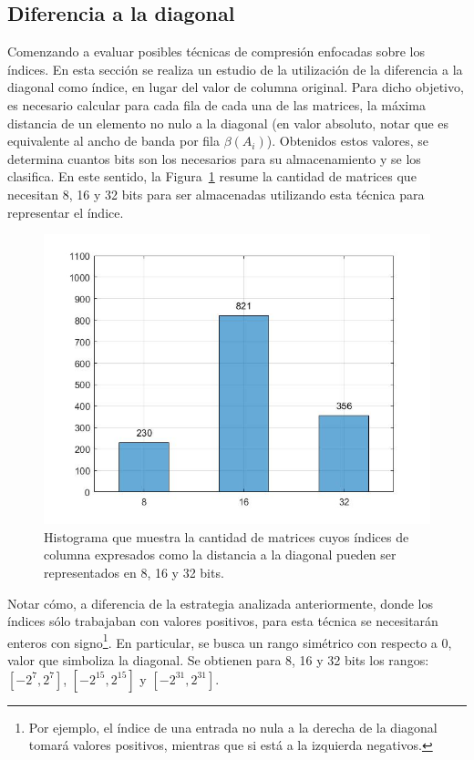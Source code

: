 \subsection{Diferencia a la diagonal}\label{diagonal-dif}

Comenzando a evaluar posibles técnicas de compresión enfocadas sobre los índices. %
En esta sección se realiza un estudio de la utilización de la diferencia a la diagonal como índice, en lugar del valor de columna original. Para dicho objetivo, es necesario calcular para cada fila de cada una de las matrices, la máxima distancia de un elemento no nulo a la diagonal (en valor absoluto, notar que es equivalente al ancho de banda por fila $\beta (A_i)$). Obtenidos estos valores, se determina cuantos bits son los necesarios  para su almacenamiento y se los clasifica. En este sentido, la Figura~\ref{fig:hist_diag_dist_cat} resume la cantidad de matrices que necesitan 8, 16 y 32 bits para ser almacenadas utilizando esta técnica para representar el índice. 

\begin{figure}[h]
  \centering
  \includegraphics[width=.6\textwidth]{imagenes/chap4/hist_diag_dist_cat.jpg}
  \caption{%
  Histograma que muestra la cantidad de matrices cuyos índices de columna expresados como la distancia a la diagonal pueden ser representados en 8, 16 y 32 bits.}
  \label{fig:hist_diag_dist_cat}
\end{figure}%


Notar cómo, a diferencia de la estrategia analizada anteriormente, donde los índices sólo trabajaban con valores positivos, para esta técnica se necesitarán enteros con signo\footnote{Por ejemplo, el índice de una entrada no nula a la derecha de la diagonal tomará valores positivos, mientras que si está a la izquierda negativos.}. En particular, se busca un rango simétrico con respecto a 0, valor que simboliza la diagonal. Se obtienen para 8, 16 y 32 bits los rangos: $[-2^7,2^7]$, $[-2^{15},2^{15}]$ y $[-2^{31},2^{31}]$.



